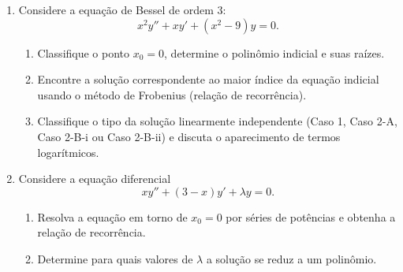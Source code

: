 \begin{enumerate}
	\item Considere a equação de Bessel de ordem $3$:
	      $$
		      x^2y'' + xy' + (x^2-9)y = 0.
	      $$
	      \begin{enumerate}
		      \item Classifique o ponto $x_0=0$, determine o polinômio
		            indicial e suas raízes.
		      \item Encontre a solução correspondente ao maior índice da
		            equação indicial usando o método de Frobenius (relação de
		            recorrência).
		      \item Classifique o tipo da solução linearmente independente
		            (Caso 1, Caso 2-A, Caso 2-B-i ou Caso 2-B-ii) e discuta o
		            aparecimento de termos logarítmicos.
	      \end{enumerate}

	\item Considere a equação diferencial
	      $$
		      xy'' + (3-x)y' + \lambda y = 0.
	      $$
	      \begin{enumerate}
		      \item Resolva a equação em torno de $x_0=0$ por séries de
		            potências e obtenha a relação de recorrência.
		      \item Determine para quais valores de $\lambda$ a solução se
		            reduz a um polinômio.
	      \end{enumerate}

\end{enumerate}


